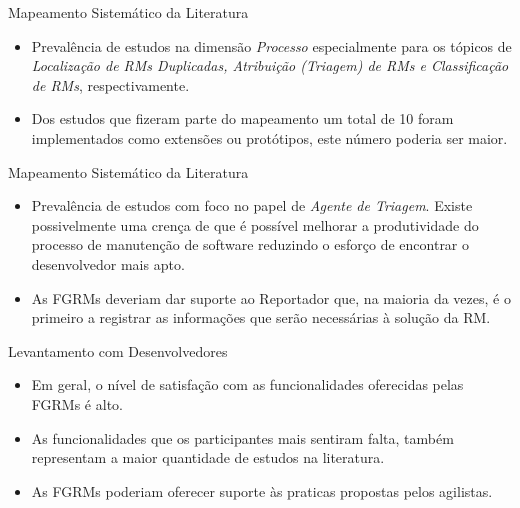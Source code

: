\documentclass[t,14pt,mathserif]{beamer}
\begin{document}
\begin{frame}{Mapeamento Sistemático da Literatura}

    \begin{itemize}
        \item Prevalência de estudos na dimensão \textit{Processo} especialmente
            para os tópicos de \textit{Localização de RMs Duplicadas, Atribuição
                (Triagem) de RMs e Classificação de RMs}, respectivamente.
        \item Dos estudos que fizeram parte do mapeamento um total de 10 foram
            implementados como extensões ou protótipos, este número poderia ser
            maior.
    \end{itemize}

\end{frame}

\begin{frame}{Mapeamento Sistemático da Literatura}

    \begin{itemize}
        \item Prevalência de estudos com foco no papel de
            \textit{Agente de Triagem}. Existe possivelmente uma crença de que é
            possível melhorar a produtividade do processo de manutenção de
            software reduzindo o esforço de encontrar o desenvolvedor mais apto.
        \item As FGRMs deveriam dar suporte ao Reportador que, na maioria da
            vezes, é o primeiro a registrar as informações que serão necessárias
            à solução da RM\@.
    \end{itemize}

\end{frame}
\begin{frame}{Levantamento com Desenvolvedores}
    \begin{itemize}
        \item Em geral, o nível de satisfação com as funcionalidades oferecidas
            pelas FGRMs é alto.
        \item As funcionalidades que os
            participantes mais sentiram falta, também representam a maior
            quantidade de estudos na literatura.
        \item As FGRMs poderiam oferecer suporte às praticas propostas pelos
            agilistas.
    \end{itemize}
\end{frame}
\end{document}
